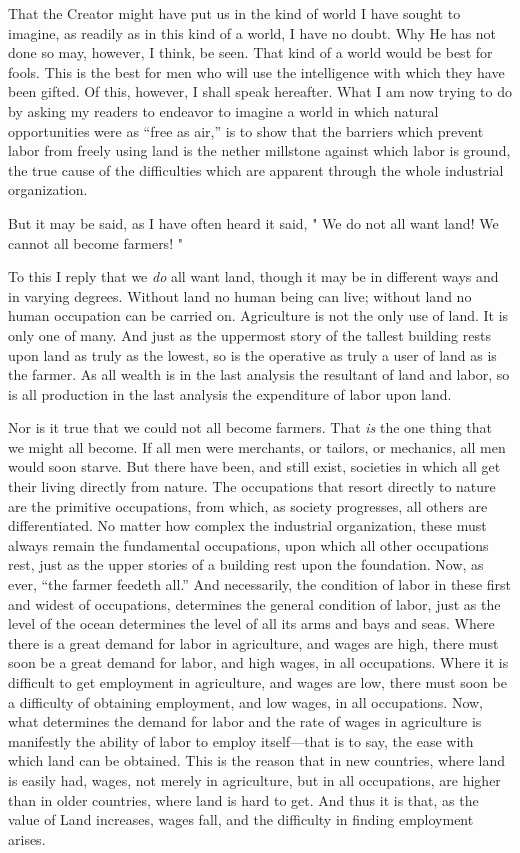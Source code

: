 \documentclass{book}
\begin{document}
That the Creator might have put us in the kind of world I have sought to imagine, as readily as in this kind of a world, I have no doubt. Why He has not done so may, however, I think, be seen. That kind of a world would be best for fools. This is the best for men who will use the intelligence with which they have been gifted. Of this, however, I shall speak hereafter. What I am now trying to do by asking my readers to endeavor to imagine a world in which natural opportunities were as “free as air,” is to show that the barriers which prevent labor from freely using land is the nether millstone against which labor is ground, the true cause of the difficulties which are apparent through the whole industrial organization.

But it may be said, as I have often heard it said, " We do not all want land! We cannot all become farmers! "

To this I reply that we \emph{do} all want land, though it may be in different ways and in varying degrees. Without land no human being can live; without land no human occupation can be carried on. Agriculture is not the only use of land. It is only one of many. And just as the uppermost story of the tallest building rests upon land as truly as the lowest, so is the operative as truly a user of land as is the farmer. As all wealth is in the last analysis the resultant of land and labor, so is all production in the last analysis the expenditure of labor upon land.

Nor is it true that we could not all become farmers. That \emph{is} the one thing that we might all become. If all men were merchants, or tailors, or mechanics, all men would soon starve. But there have been, and still exist, societies in which all get their living directly from nature. The occupations that resort directly to nature are the primitive occupations, from which, as society progresses, all others are differentiated. No matter how complex the industrial organization, these must always remain the fundamental occupations, upon which all other occupations rest, just as the upper stories of a building rest upon the foundation. Now, as ever, “the farmer feedeth all.” And necessarily, the condition of labor in these first and widest of occupations, determines the general condition of labor, just as the level of the ocean determines the level of all its arms and bays and seas. Where there is a great demand for labor in agriculture, and wages are high, there must soon be a great demand for labor, and high wages, in all occupations. Where it is difficult to get employment in agriculture, and wages are low, there must soon be a difficulty of obtaining employment, and low wages, in all occupations. Now, what determines the demand for labor and the rate of wages in agriculture is manifestly the ability of labor to employ itself—that is to say, the ease with which land can be obtained. This is the reason that in new countries, where land is easily had, wages, not merely in agriculture, but in all occupations, are higher than in older countries, where land is hard to get. And thus it is that, as the value of Land increases, wages fall, and the difficulty in finding employment arises.
\end{document}
